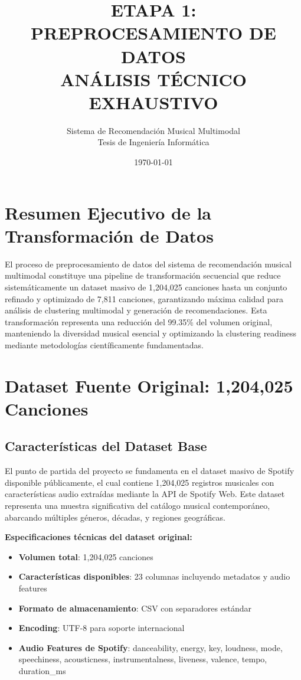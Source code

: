 \documentclass[12pt,a4paper]{article}
\title{\textbf{ETAPA 1: PREPROCESAMIENTO DE DATOS\\ANÁLISIS TÉCNICO EXHAUSTIVO}}
\author{Sistema de Recomendación Musical Multimodal\\Tesis de Ingeniería Informática}
\date{\today}
\begin{document}
\maketitle
\tableofcontents
\newpage

\section{Resumen Ejecutivo de la Transformación de Datos}

El proceso de preprocesamiento de datos del sistema de recomendación musical multimodal constituye una pipeline de transformación secuencial que reduce sistemáticamente un dataset masivo de 1,204,025 canciones hasta un conjunto refinado y optimizado de 7,811 canciones, garantizando máxima calidad para análisis de clustering multimodal y generación de recomendaciones. Esta transformación representa una reducción del 99.35\% del volumen original, manteniendo la diversidad musical esencial y optimizando la clustering readiness mediante metodologías científicamente fundamentadas.

\section{Dataset Fuente Original: 1,204,025 Canciones}

\subsection{Características del Dataset Base}

El punto de partida del proyecto se fundamenta en el dataset masivo de Spotify disponible públicamente, el cual contiene 1,204,025 registros musicales con características audio extraídas mediante la API de Spotify Web. Este dataset representa una muestra significativa del catálogo musical contemporáneo, abarcando múltiples géneros, décadas, y regiones geográficas.

\textbf{Especificaciones técnicas del dataset original:}
\begin{itemize}[leftmargin=*]
    \item \textbf{Volumen total}: 1,204,025 canciones
    \item \textbf{Características disponibles}: 23 columnas incluyendo metadatos y audio features
    \item \textbf{Formato de almacenamiento}: CSV con separadores estándar
    \item \textbf{Encoding}: UTF-8 para soporte internacional
    \item \textbf{Audio Features de Spotify}: danceability, energy, key, loudness, mode, speechiness, acousticness, instrumentalness, liveness, valence, tempo, duration\_ms
\end{itemize}
\end{document}
